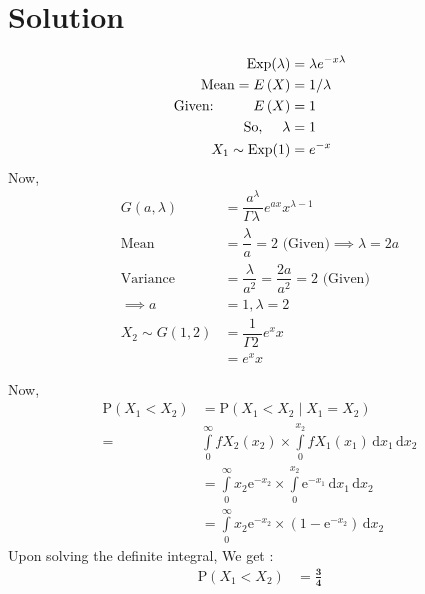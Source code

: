 \documentclass[twocolumn]{article}
\providecommand{\brak}[1]{\ensuremath{\left(#1\right)}}
\begin{document}
\section*{Solution}
\begin{align}
\operatorname{Exp}(\lambda) &= \lambda e^{-x \lambda} \\
\text{Mean} = E \brak{X} &= 1/ \lambda \\
\text{Given:} \hspace{1cm}  E \brak{X} &= 1 \\
\text{So,}  \hspace{0.5cm} \lambda &= 1 \\
X_1\sim \operatorname{Exp}(1) &= e^{-x}
\end{align}
Now,
\begin{align}
G(a,\lambda) &= \dfrac{a^{\lambda}}{\Gamma{\lambda}\ } e^{ax}x^{\lambda-1} \\
\text{Mean} &= \dfrac{\lambda}{a}=2 \text{ (Given)}
\implies \lambda = 2a \\
\text{Variance} &=  \dfrac{\lambda}{a^2}=\dfrac{2a}{a^2}=2 \text{ (Given)} \\ \implies a &= 1,\lambda=2 \\
X_2\sim G(1,2) &= \dfrac{1}{\Gamma{2}\ } e^{x}x \\
 &= e^{x}x
\end{align}

Now,
\begin{align}
  \mathrm{P}(X_1<X_2) &= \mathrm{P}\brak{X_1 < X_2 \mid X_1 = X_2} \\
  =& \int \limits_{0}^{\infty} fX_2 \brak{x_2} \times \int \limits_{0}^{x_2} fX_1 \brak{x_1} \, \mathrm{d}x_1 \, \mathrm{d}x_2 \\
  &= \int \limits_{0}^{\infty} x_2 \mathrm{e}^{-x_2} \times \int \limits_{0}^{x_2} \mathrm{e}^{-x_1} \, \mathrm{d}x_1 \, \mathrm{d}x_2 \\
  &= \int \limits_{0}^{\infty} x_2 \mathrm{e}^{-x_2} \times \brak{1-\mathrm{e}^{-x_2} } \, \mathrm{d}x_2 
\end{align}
Upon solving the definite integral, We get :
\begin{align}
   \mathrm{P}(X_1<X_2) &= \mathbf{ \frac{3}{4} } 
\end{align}
\end{document}

